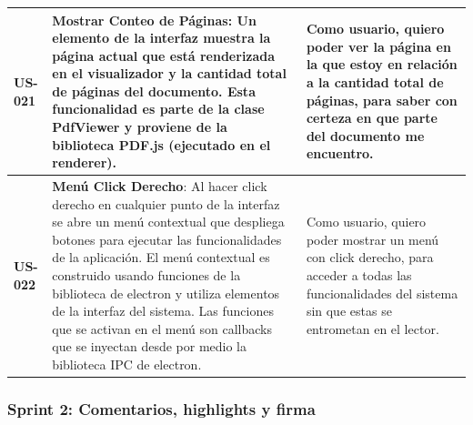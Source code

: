 \begin{longtable}{|l||p{7cm}|p{4.5cm}|}
\hline
\textbf{US-021} & \textbf{Mostrar Conteo de Páginas}: Un elemento de la interfaz muestra la página actual que está renderizada en el visualizador y la cantidad total de páginas del documento.  Esta funcionalidad es parte de la clase PdfViewer y proviene de la biblioteca PDF.js (ejecutado en el renderer). & Como usuario, quiero poder ver la página en la que estoy en relación a la cantidad total de páginas, para saber con certeza en que parte del documento me encuentro.\\
\hline
\textbf{US-022} & \textbf{Menú Click Derecho}: Al hacer click derecho en cualquier punto de la interfaz se abre un menú contextual que despliega botones para ejecutar las funcionalidades de la aplicación. El menú contextual es construido usando funciones de la biblioteca de electron y utiliza elementos de la interfaz del sistema. Las funciones que se activan en el menú son callbacks que se inyectan desde por medio la biblioteca IPC de electron. & Como usuario, quiero poder mostrar un menú con click derecho, para acceder a todas las funcionalidades del sistema sin que estas se entrometan en el lector.\\
\hline
\end{longtable}

\subsubsection{Sprint 2: Comentarios, highlights y firma}

